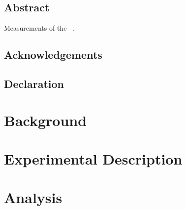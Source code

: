 \documentclass[a4paper,12pt,titlepic]{report}
\begin{document}



\onehalfspacing

\chapter*{Abstract}
Measurements of the \ZZ\ \cx.

\chapter*{Acknowledgements}

\chapter*{Declaration}

\tableofcontents
\listoffigures
{}
\listoftables
{}




\part{Background}
\label{part:bg}





\part{Experimental Description}
\label{part:experiment}




%

\part{Analysis}
\label{part:analysis}

\end{document}
